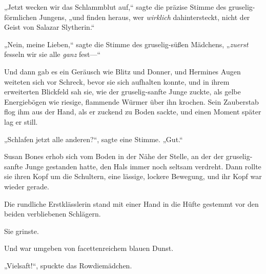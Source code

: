 „Jetzt wecken wir das Schlammblut auf,“ sagte die präzise Stimme des gruselig-förmlichen Jungens, „und finden heraus, wer \emph{wirklich} dahintersteckt, nicht der Geist von Salazar Slytherin.“

„Nein, meine Lieben,“ sagte die Stimme des gruselig-süßen Mädchens, „\emph{zuerst} fesseln wir sie alle \emph{ganz} fest—“

Und dann gab es ein Geräusch wie Blitz und Donner, und Hermines Augen weiteten sich vor Schreck, bevor sie sich aufhalten konnte, und in ihrem erweiterten Blickfeld sah sie, wie der gruselig-sanfte Junge zuckte, als gelbe Energiebögen wie riesige, flammende Würmer über ihn krochen. Sein Zauberstab flog ihm aus der Hand, als er zuckend zu Boden sackte, und einen Moment später lag er still.

„Schlafen jetzt alle anderen?“, sagte eine Stimme. „Gut.“

Susan Bones erhob sich vom Boden in der Nähe der Stelle, an der der gruselig-sanfte Junge gestanden hatte, den Hals immer noch seltsam verdreht. Dann rollte sie ihren Kopf um die Schultern, eine lässige, lockere Bewegung, und ihr Kopf war wieder gerade.

Die rundliche Erstklässlerin stand mit einer Hand in die Hüfte gestemmt vor den beiden verbliebenen Schlägern.

Sie grinste.

Und war umgeben von facettenreichem blauen Dunst.

„Vielsaft!“, spuckte das Rowdiemädchen.

